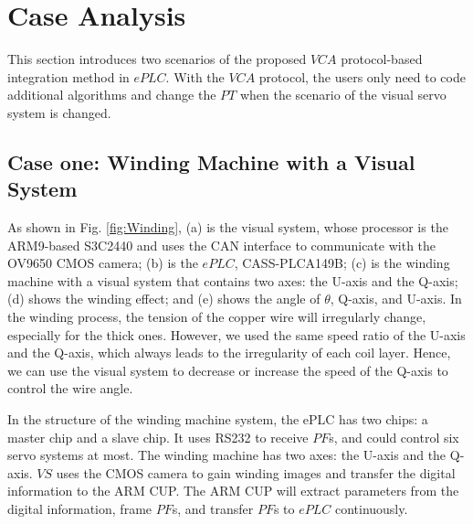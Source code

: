 \documentclass[journal,UTF8]{IEEEtran}
\begin{document}
	\section{Case Analysis}
	\label{Case}
	This section introduces two scenarios of the proposed $VCA$ protocol-based integration method in $ePLC$. With the $VCA$ protocol, the users only need to code additional algorithms and change the $PT$ when the scenario of the visual servo system is changed. 
	
	\subsection{Case one: Winding Machine with a Visual System}
	
	As shown in Fig. \ref{fig:Winding}, 
	(a) is the visual system, whose processor is the ARM9-based S3C2440 and uses the CAN interface to communicate with the OV9650 CMOS camera; (b) is the $ePLC$, CASS-PLCA149B; (c) is the winding machine with a visual system that contains two axes: the U-axis and the Q-axis; (d) shows the winding effect; and (e) shows the angle of $\theta$, Q-axis, and U-axis.
	In the winding process, the tension of the copper wire will irregularly change, especially for the thick ones. However, we used the same speed ratio of the U-axis and the Q-axis, which always leads to the irregularity of each coil layer. Hence, we can use the visual system to decrease or increase the speed of the Q-axis to control the wire angle. 
	
	In the structure of the winding machine system, the ePLC has two chips: a master chip and a slave chip. It uses RS232 to receive $PF$s, and could control six servo systems at most. The winding machine has two axes: the U-axis and the Q-axis. $VS$ uses the CMOS camera to gain winding images and transfer the digital information to the ARM CUP. The ARM CUP will extract parameters from the digital information, frame $PF$s, and transfer $PF$s to $ePLC$ continuously. 
	
	
\end{document}
